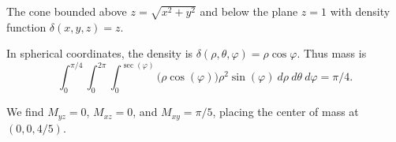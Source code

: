 {
The cone bounded above $z=\sqrt{x^2+y^2}$ and below the plane $z=1$ with density function $\delta(x,y,z) = z$.
}
{In spherical coordinates, the density is $\delta(\rho,\theta,\varphi) = \rho\cos\varphi$. Thus mass is
$$\int_0^{\pi/4}\int_0^{2\pi}\int_{0}^{\sec(\varphi)} \big(\rho\cos(\varphi)\big)\rho^2\sin(\varphi)\ d\rho\ d\theta\ d\varphi = \pi/4.$$

We find $M_{yz} = 0$, $M_{xz} = 0$, and $M_{xy} = \pi/5$, placing the center of mass at $(0,0,4/5)$.
}
